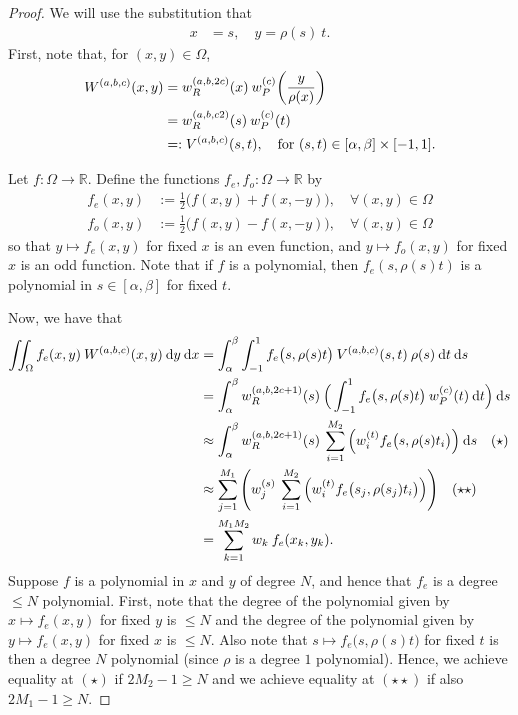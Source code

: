 \documentclass[11pt, oneside]{article}   	%
\newcommand{\half}{\frac{1}{2}}
\newcommand{\R}{\mathbb{R}}
\newcommand{\genjac}{R}
\newcommand{\genjacw}{w_\genjac}
\newcommand{\jacw}{w_P}
\newcommand{\Wabc}{{W^{(a,b,c)}}}
\begin{document}
\begin{proof}
We will use the substitution that
\begin{align*}
	x &= s, \quad y = \rho(s) \: t.
\end{align*}
First, note that, for $(x,y) \in \Omega$,
\begin{align*}
	\Wabc(x,y) &= \genjacw^{(a,b,2c)}(x) \: \jacw^{(c)}\fpr(\frac{y}{\rho(x)}) \\
	&= \genjacw^{(a,b,c2)}(s) \: \jacw^{(c)}(t) \\
	&=: V^{(a,b,c)}(s,t), \quad \text{for } (s,t) \in [\alpha,\beta] \times [-1,1].
\end{align*}

Let $f : \Omega \to \R$. Define the functions $f_e, f_o : \Omega \to \R$ by 
\begin{align*}
	f_e(x,y) &:= \half \Big(f(x, y) + f(x, -y)\Big), \quad \forall (x,y) \in \Omega\\
	f_o(x,y) &:= \half \Big(f(x, y) - f(x, -y)\Big), \quad \forall (x,y) \in \Omega
\end{align*}
so that $y \mapsto f_e(x,y)$ for fixed $x$ is an even function, and $y \mapsto f_o(x,y)$ for fixed $x$ is an odd function. Note that if $f$ is a polynomial, then $f_e(s, \rho(s)t)$ is a polynomial in $s \in [\alpha,\beta]$ for fixed $t$. 

Now, we have that
\begin{align*}
	\iint_\Omega f_e(x,y) \: \Wabc(x,y) \: \D y \: \D x &= \int_\alpha^\beta \int_{-1}^1 f_e\big(s,\rho(s) t\big) \: V^{(a,b,c)}(s,t) \: \rho(s) \: \D t \: \D s \\
	&= \int_\alpha^\beta \genjacw^{(a,b,2c+1)}(s) \: \Big( \int_{-1}^1 f_e\big(s,\rho(s) t\big) \: \jacw^{(c)}(t) \: \D t \Big) \: \D s \\
	&\approx \int_\alpha^\beta \genjacw^{(a,b,2c+1)}(s) \: \sum_{i=1}^{M_2} \Big( w_i^{(t)} f_e\big(s,\rho(s) t_i\big) \Big) \: \D s \quad (\star) \\
	&\approx \sum_{j=1}^{M_1} \Bigg( w_j^{(s)} \: \sum_{i=1}^{M_2} \Big( w_i^{(t)} f_e\big(s_j,\rho(s_j) t_i\big) \Big) \Bigg) \quad (\star \star) \\
	&= \sum_{k=1}^{M_1 M_2}  w_k \: f_e(x_k, y_k).
\end{align*}
Suppose $f$ is a polynomial in $x$ and $y$ of degree $N$, and hence that $f_e$ is a degree $\le N$ polynomial. First, note that the degree of the polynomial given by $x \mapsto f_e(x,y)$ for fixed $y$ is $\le N$ and the degree of the polynomial given by $y \mapsto f_e(x,y)$ for fixed $x$ is $\le N$. Also note that $s \mapsto f_e\big(s,\rho(s) t\big)$ for fixed $t$ is then a degree $N$ polynomial (since $\rho$ is a degree $1$ polynomial). Hence, we achieve equality at $(\star)$ if $2M_2 - 1 \ge N$ and we achieve equality at $(\star \star)$ if also $2M_1 - 1 \ge N$.


\end{proof}
\end{document}
